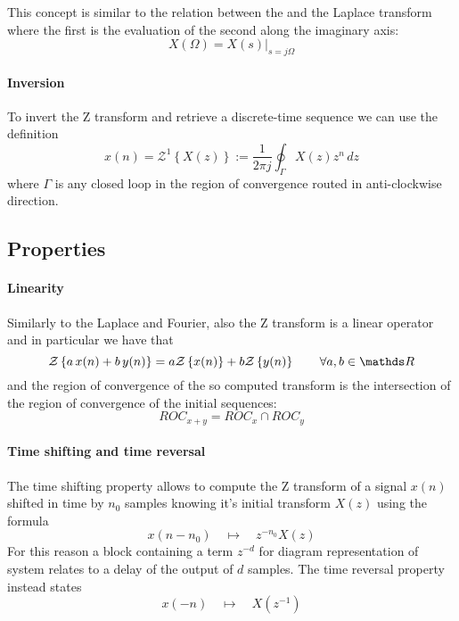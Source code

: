 	This concept is similar to the relation between the \ctft and the Laplace transform where the first is the evaluation of the second along the imaginary axis:
	\[ X(\Omega) = X(s) \Big|_{s=j\Omega} \]
	
	\paragraph{Inversion} To invert the Z transform and retrieve a discrete-time sequence we can use the definition
	\begin{equation}
		x(n) = \mathcal Z^1\left\{ X(z) \right\} := \frac{1}{2\pi j} \oint_\Gamma X(z) z^n\, dz
	\end{equation}
	where $\Gamma$ is any closed loop in the region of convergence routed in anti-clockwise direction.
	
	\subsection{Properties}
		\paragraph{Linearity} Similarly to the Laplace and Fourier, also the Z transform is a linear operator and in particular we have that
		\begin{equation}
			\Z{a\, x(n) + b\, y(n) } = a \Z{x(n)} + b \Z{y(n)} \qquad \forall a,b\in \mathds R
		\end{equation}
		and the region of convergence of the so computed transform is the intersection of the region of convergence of the initial sequences:
		\[ ROC_{x+y} = ROC_x \cap ROC_y \]
		
		\paragraph{Time shifting and time reversal} The time shifting property allows to compute the Z transform of a signal $x(n)$ shifted in time by $n_0$ samples knowing it's initial transform $X(z)$ using the formula
		\begin{equation}
			x(n-n_0) \quad \mapsto \quad z^{-n_0} X(z)
		\end{equation}
		For this reason a block containing a term $z^{-d}$ for diagram representation of system relates to a delay of the output of $d$ samples.  The time reversal property instead states
		\begin{equation}
			x(-n) \quad \mapsto \quad X(z^{-1})
		\end{equation}
		
